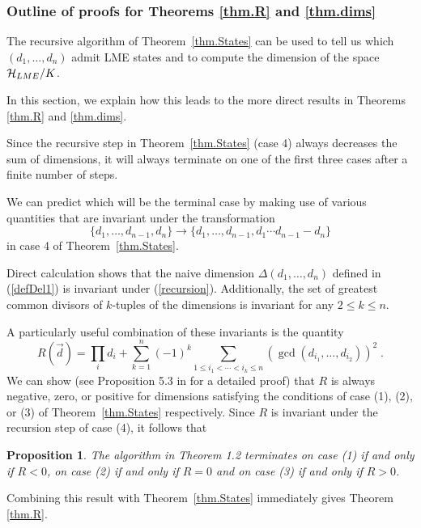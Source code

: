 \documentclass[12pt]{article}
\newtheorem{proposition}[theorem]{Proposition}
\theoremstyle{definition}
\newcommand{\be}{\begin{equation}}
\newcommand{\ee}{\end{equation}}
\begin{document}
\subsubsection*{Outline of proofs for Theorems \ref{thm.R} and \ref{thm.dims}}

The recursive algorithm of Theorem~\ref{thm.States} can be used to tell us which $(d_1, \dots, d_n)$ admit LME states and to
compute the dimension of the space ${\cal H}_{LME}/K$.

In this section, we explain how this leads to the more direct results in Theorems \ref{thm.R} and \ref{thm.dims}.

Since the recursive step in Theorem~\ref{thm.States} (case 4) always decreases the sum of dimensions, it will always terminate on one of the first three cases after a finite number of steps.

We can predict which will be the terminal case by making use of various quantities that are invariant under the transformation
\be
\label{recursion}
\{d_1,\dots,d_{n-1}, d_n\} \rightarrow \{d_1,\dots,d_{n-1}, d_1 \cdots d_{n-1} - d_n\}
\ee
in case 4 of Theorem~\ref{thm.States}.

Direct calculation shows that the naive dimension  $\Delta(d_1, \dots, d_n)$ defined in (\ref{defDel1}) is invariant under (\ref{recursion}). Additionally, the set of greatest common divisors of $k$-tuples of the dimensions is invariant for any $2 \le k \le n$.

A particularly useful combination of these invariants is the quantity
\be
R(\vec{d}) = \prod_i d_i + \sum_{k=1}^n (-1)^k \sum_{1 \le i_1 < \cdots < i_k \le n} (\gcd(d_{i_1},\dots,d_{i_2}))^2 \; .
\ee
We can show (see Proposition 5.3 in \cite{mathpaper} for a detailed proof) that $R$ is always negative, zero, or positive for dimensions satisfying the conditions of case (1), (2), or (3) of Theorem~\ref{thm.States} respectively. Since $R$ is invariant under the recursion step of case (4), it follows that
\begin{proposition}\label{prop:Rcases}
The algorithm in Theorem 1.2 terminates on case (1) if and only if $R<0$, on case (2) if and only if $R=0$ and on case (3) if and only if $R>0$.
\end{proposition}
Combining this result with Theorem~\ref{thm.States} immediately gives Theorem \ref{thm.R}.
\end{document}
